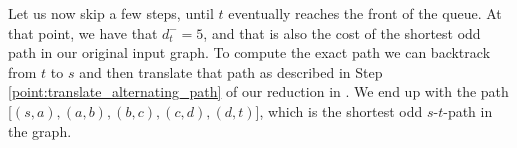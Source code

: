 Let us now skip a few steps, until $t$ eventually reaches the front of the queue. At that point, we have that $d^-_t = 5$, and that is also the cost of the shortest odd path in our original input graph. To compute the exact path we can backtrack from $t$ to $s$ and then translate that path as described in Step \ref{point:translate_alternating_path} of our reduction in . We end up with the path [$(s,a),(a,b),(b,c),(c,d),(d,t)$], which is the shortest odd $s$-$t$-path in the graph.

